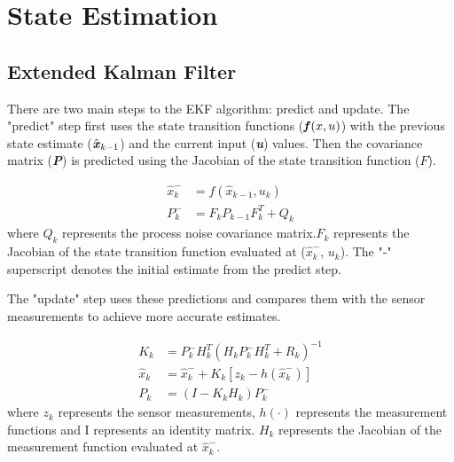 \section{State Estimation}





\subsection{Extended Kalman Filter}\label{section:EKFBackground}
There are two main steps to the EKF algorithm: predict and update.
The "predict" step first uses the state transition functions ($\textbf{\textit{f}}(x,u)$) with the previous state estimate ($\hat{\textbf{\textit{x}}}_{k-1}$) and the current input (\textbf{\textit{u}}) values. Then the covariance matrix (\textbf{\textit{P}}) is predicted using the Jacobian of the state transition function ($F$).

\begin{equation}
\begin{split}
\hat{x}_{k}^{-}&=f(\hat{x}_{k-1}, u_{k})\\
P_{k}^{-}&=F_{k}P_{k-1}F_{k}^{T}+Q_{k}
\end{split}
\end{equation}
where $Q_{k}$ represents the process noise covariance matrix.$F_{k}$ represents the Jacobian of the state transition function evaluated at ($\hat{x}_{k}^{-}$, $u_{k}$).  The "-" superscript denotes the initial estimate from the predict step.


The "update" step uses these predictions and compares them with the sensor measurements to achieve more accurate estimates.

\begin{equation}
\begin{split}
K_{k}&=P_{k}^{-}H_{k}^{T}(H_{k}P_{k}^{-}H_{k}^{T}+R_{k})^{-1}\\
\hat{x}_{k}&=\hat{x}_{k}^{-}+K_{k}\left[z_{k}-h(\hat{x}_{k}^{-})\right]\\
P_{k}&=(I-K_{k}H_{k})P_{k}^{-}
\end{split}
\end{equation}
where $z_{k}$ represents the sensor measurements, $h(\cdot)$ represents the measurement functions and I represents an identity matrix. $H_{k}$ represents the Jacobian of the measurement function evaluated at $\hat{x}_{k}^{-}$.


